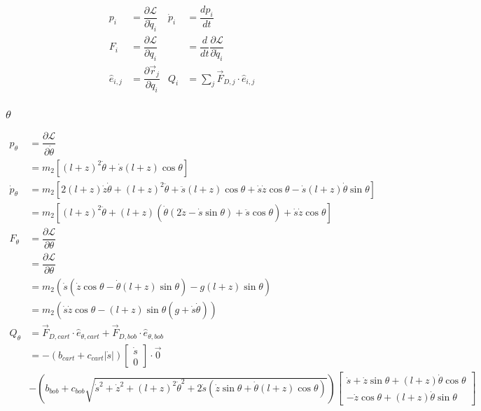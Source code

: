\documentclass[12pt,a4paper,portrait]{article}
\newcommand{\lag}{\mathcal{L}}
\begin{document}
\begin{align*}
	p_i &= \dfrac{\partial \lag}{\partial \dot{q}_i} & \dot{p}_i &= \dfrac{dp_i}{dt} \\
	F_i &= \dfrac{\partial \lag}{\partial q_i} & &= \dfrac{d}{dt}\dfrac{\partial \lag}{\partial \dot{q}_i}\\
	\hat{e}_{i,j} &= \dfrac{\partial \vec{r}_{j}}{\partial q_i} & Q_i &= \sum_{j} \vec{F}_{D, j} \cdot \hat{e}_{i,j}
\end{align*}

\subsubsection{$\theta$}
\begin{align*}
	p_{\theta} &= \dfrac{\partial \lag}{\partial \dot{\theta}} \\
	&= m_2 \left[(l+z)^2 \dot{\theta} + \dot{s}(l+z)\cos{\theta}\right] \\
	\dot{p}_{\theta} &= m_2\left[2(l+z)\dot{z}\dot{\theta} + (l+z)^2\ddot{\theta} + \ddot{s}(l+z)\cos{\theta} + \dot{s}\dot{z}\cos{\theta} - \dot{s}(l+z)\dot{\theta}\sin{\theta}\right] \\
	&= m_2 \left[(l+z)^2 \ddot{\theta} + (l+z)\left(\dot{\theta}(2\dot{z} - \dot{s}\sin{\theta}) + \ddot{s}\cos{\theta}\right) + \dot{s}\dot{z}\cos{\theta}\right]\\
	F_{\theta} &= \dfrac{\partial \lag}{\partial \theta} \\
	&= \dfrac{\partial \lag}{\partial \theta} \\
	&= m_2(\dot{s}(\dot{z}\cos{\theta} - \dot{\theta}(l+z)\sin{\theta}) - g(l+z)\sin{\theta})\\
	&= m_2(\dot{s}\dot{z}\cos{\theta}-(l+z)\sin{\theta}(g+\dot{s}\dot{\theta})) \\
	Q_{\theta} &= \vec{F}_{D,cart} \cdot \hat{e}_{\theta,cart} + \vec{F}_{D,bob} \cdot \hat{e}_{\theta,bob} \\
	&= -(b_{cart}+c_{cart}|\dot{s}|)\begin{bmatrix}
		\dot{s}\\
		0
	\end{bmatrix} \cdot \vec{0}\\
	&-(b_{bob}+c_{bob}\sqrt{\dot{s}^2 + \dot{z}^2 + (l+z)^2\dot{\theta}^2 + 2\dot{s}(\dot{z}\sin{\theta} + \dot{\theta}(l+z)\cos{\theta})})\begin{bmatrix}
		\dot{s} + \dot{z}\sin{\theta} + (l+z)\dot{\theta}\cos{\theta} \\
		-\dot{z}\cos{\theta} + (l+z)\dot{\theta}\sin{\theta}

\end{bmatrix}
\end{align*}
\end{document}
